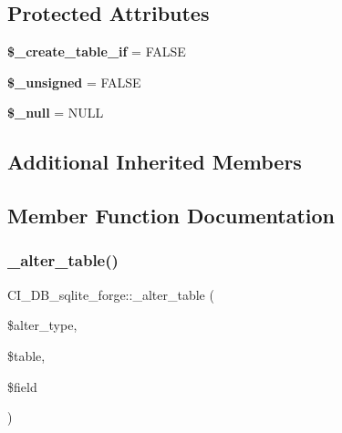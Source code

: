 \subsection*{Protected Attributes}
\begin{DoxyCompactItemize}
\item 
\mbox{\label{class_c_i___d_b__sqlite__forge_a99edc8aee3dc65e38f050778a8a57b36}} 
{\bfseries \$\+\_\+create\+\_\+table\+\_\+if} = F\+A\+L\+SE
\item 
\mbox{\label{class_c_i___d_b__sqlite__forge_a24974d2133ba2970dc62d962d76c562b}} 
{\bfseries \$\+\_\+unsigned} = F\+A\+L\+SE
\item 
\mbox{\label{class_c_i___d_b__sqlite__forge_ac00a99d0e2004590f25d70c950e9f2dd}} 
{\bfseries \$\+\_\+null} = \textquotesingle{}N\+U\+LL\textquotesingle{}
\end{DoxyCompactItemize}
\subsection*{Additional Inherited Members}


\subsection{Member Function Documentation}
\mbox{\label{class_c_i___d_b__sqlite__forge_aa3711cb3973739f5b3665969da1bf649}} 
\subsubsection{\texorpdfstring{\+\_\+alter\+\_\+table()}{\_alter\_table()}}
{\footnotesize\ttfamily C\+I\+\_\+\+D\+B\+\_\+sqlite\+\_\+forge\+::\+\_\+alter\+\_\+table (\begin{DoxyParamCaption}\item[{}]{\$alter\+\_\+type,  }\item[{}]{\$table,  }\item[{}]{\$field }\end{DoxyParamCaption})\hspace{0.3cm}{\ttfamily [protected]}}

